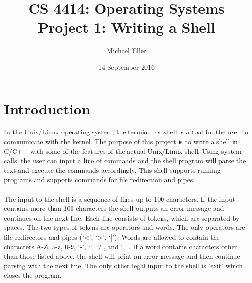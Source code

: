 \documentclass[12pt,letter,titlepage]{article}
\title{\blue CS 4414: Operating Systems\\
\blueb Project 1: Writing a Shell}
\author{Michael Eller}
\date{14 September 2016}
\begin{document}
\maketitle

\section*{Introduction}
In the Unix/Linux operating system, the terminal or shell is a tool for the user to communicate with the kernel. The purpose of this project is to write a shell in C/C++ with some of the features of the actual Unix/Linux shell. Using system calls, the user can input a line of commands and the shell program will parse the text and execute the commands accordingly. This shell supports running programs and supports commands for file redirection and pipes. \\ \\
The input to the shell is a sequence of lines up to 100 characters. If the input contains more than 100 characters the shell outputs an error message and continues on the next line. Each line consists of \color{orange}tokens\color{black}, which are separated by spaces. The two types of tokens are \color{orange}operators \color{black}  and \color{orange}words\color{black}. The only operators are file redirectors and pipes (`<', `>', `|'). Words are allowed to contain the characters A-Z, a-z, 0-9, `-', `.', `/', and `\_'. If a word contains characters other than those listed above, the shell will print an error message and then continue parsing with the next line. The only other legal input to the shell is 'exit' which closes the program. 
\end{document}
